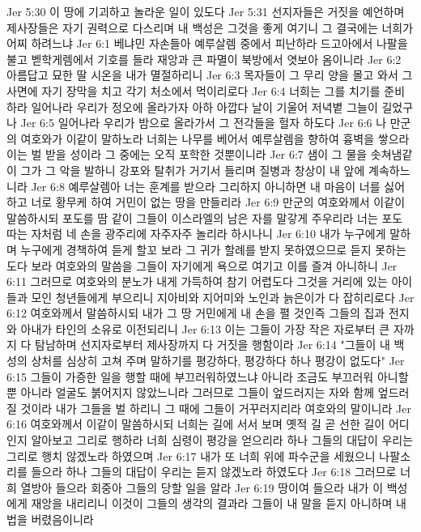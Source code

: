 Jer 5:30  이 땅에 기괴하고 놀라운 일이 있도다
Jer 5:31  선지자들은 거짓을 예언하며 제사장들은 자기 권력으로 다스리며 내 백성은 그것을 좋게 여기니 그 결국에는 너희가 어찌 하려느냐
Jer 6:1  베냐민 자손들아 예루살렘 중에서 피난하라 드고아에서 나팔을 불고 벧학게렘에서 기호를 들라 재앙과 큰 파멸이 북방에서 엿보아 옴이니라
Jer 6:2  아름답고 묘한 딸 시온을 내가 멸절하리니
Jer 6:3  목자들이 그 무리 양을 몰고 와서 그 사면에 자기 장막을 치고 각기 처소에서 먹이리로다
Jer 6:4  너희는 그를 치기를 준비하라 일어나라 우리가 정오에 올라가자 아하 아깝다 날이 기울어 저녁볕 그늘이 길었구나
Jer 6:5  일어나라 우리가 밤으로 올라가서 그 전각들을 헐자 하도다
Jer 6:6  나 만군의 여호와가 이같이 말하노라 너희는 나무를 베어서 예루살렘을 향하여 흉벽을 쌓으라 이는 벌 받을 성이라 그 중에는 오직 포학한 것뿐이니라
Jer 6:7  샘이 그 물을 솟쳐냄같이 그가 그 악을 발하니 강포와 탈취가 거기서 들리며 질병과 창상이 내 앞에 계속하느니라
Jer 6:8  예루살렘아 너는 훈계를 받으라 그리하지 아니하면 내 마음이 너를 싫어하고 너로 황무케 하여 거민이 없는 땅을 만들리라
Jer 6:9  만군의 여호와께서 이같이 말씀하시되 포도를 땀 같이 그들이 이스라엘의 남은 자를 말갛게 주우리라 너는 포도 따는 자처럼 네 손을 광주리에 자주자주 놀리라 하시나니
Jer 6:10  내가 누구에게 말하며 누구에게 경책하여 듣게 할꼬 보라 그 귀가 할례를 받지 못하였으므로 듣지 못하는 도다 보라 여호와의 말씀을 그들이 자기에게 욕으로 여기고 이를 즐겨 아니하니
Jer 6:11  그러므로 여호와의 분노가 내게 가득하여 참기 어렵도다 그것을 거리에 있는 아이들과 모인 청년들에게 부으리니 지아비와 지어미와 노인과 늙은이가 다 잡히리로다
Jer 6:12  여호와께서 말씀하시되 내가 그 땅 거민에게 내 손을 펼 것인즉 그들의 집과 전지와 아내가 타인의 소유로 이전되리니
Jer 6:13  이는 그들이 가장 작은 자로부터 큰 자까지 다 탐남하며 선지자로부터 제사장까지 다 거짓을 행함이라
Jer 6:14  "그들이 내 백성의 상처를 심상히 고쳐 주며 말하기를 평강하다, 평강하다 하나 평강이 없도다"
Jer 6:15  그들이 가증한 일을 행할 때에 부끄러워하였느냐 아니라 조금도 부끄러워 아니할뿐 아니라 얼굴도 붉어지지 않았느니라 그러므로 그들이 엎드러지는 자와 함께 엎드러질 것이라 내가 그들을 벌 하리니 그 때에 그들이 거꾸러지리라 여호와의 말이니라
Jer 6:16  여호와께서 이같이 말씀하시되 너희는 길에 서서 보며 옛적 길 곧 선한 길이 어디인지 알아보고 그리로 행하라 너희 심령이 평강을 얻으리라 하나 그들의 대답이 우리는 그리로 행치 않겠노라 하였으며
Jer 6:17  내가 또 너희 위에 파수군을 세웠으니 나팔소리를 들으라 하나 그들의 대답이 우리는 듣지 않겠노라 하였도다
Jer 6:18  그러므로 너희 열방아 들으라 회중아 그들의 당할 일을 알라
Jer 6:19  땅이여 들으라 내가 이 백성에게 재앙을 내리리니 이것이 그들의 생각의 결과라 그들이 내 말을 듣지 아니하며 내 법을 버렸음이니라
